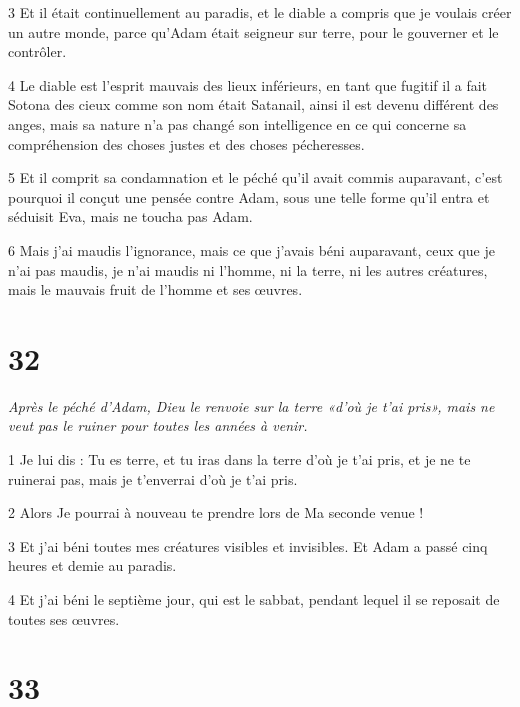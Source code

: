 \par 3 Et il était continuellement au paradis, et le diable a compris que je voulais créer un autre monde, parce qu'Adam était seigneur sur terre, pour le gouverner et le contrôler.

\par 4 Le diable est l'esprit mauvais des lieux inférieurs, en tant que fugitif il a fait Sotona des cieux comme son nom était Satanail, ainsi il est devenu différent des anges, mais sa nature n'a pas changé son intelligence en ce qui concerne sa compréhension des choses justes et des choses pécheresses.

\par 5 Et il comprit sa condamnation et le péché qu'il avait commis auparavant, c'est pourquoi il conçut une pensée contre Adam, sous une telle forme qu'il entra et séduisit Eva, mais ne toucha pas Adam.

\par 6 Mais j'ai maudis l'ignorance, mais ce que j'avais béni auparavant, ceux que je n'ai pas maudis, je n'ai maudis ni l'homme, ni la terre, ni les autres créatures, mais le mauvais fruit de l'homme et ses œuvres.

\chapter{32}

\par \textit{Après le péché d'Adam, Dieu le renvoie sur la terre «d'où je t'ai pris», mais ne veut pas le ruiner pour toutes les années à venir.}

\par 1 Je lui dis : Tu es terre, et tu iras dans la terre d'où je t'ai pris, et je ne te ruinerai pas, mais je t'enverrai d'où je t'ai pris.

\par 2 Alors Je pourrai à nouveau te prendre lors de Ma seconde venue !

\par 3 Et j'ai béni toutes mes créatures visibles et invisibles. Et Adam a passé cinq heures et demie au paradis.

\par 4 Et j'ai béni le septième jour, qui est le sabbat, pendant lequel il se reposait de toutes ses œuvres.

\chapter{33}

